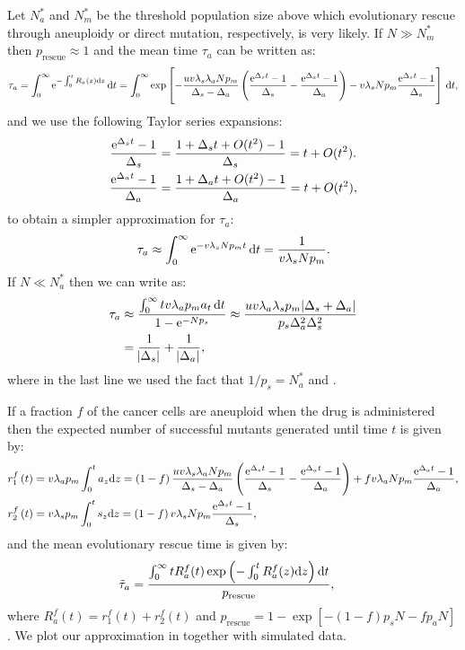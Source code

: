 \documentclass[12pt]{extarticle}
\renewcommand{\d}[1]{\ensuremath{\operatorname{d}\!{#1}}}
\renewcommand{\d}{{\rm d}}
\newcommand{\e}{{\rm e}}
\newcommand{\presc}{p_\text{rescue}}
\begin{document}
\begin{appendices}
Let $N_a^*$ and $N_m^*$ be the threshold population size above which evolutionary rescue through aneuploidy or direct mutation, respectively, is very likely. If $N\gg N_m^*$ then $\presc\approx1$ and the mean time $\tau_a$ can be written as: %
\begin{align*}
\tau_a=\int_0^\infty\e^{-\int_0^t R_a\left(z\right)\d z}\,\d t=\int_0^\infty\exp\left[-\frac{uv\lambda_s\lambda_aNp_m}{\Delta_s-\Delta_a}\left(\frac{\e^{\Delta_s t}-1}{\Delta_s}-\frac{\e^{\Delta_a t}-1}{\Delta_a}\right)-v\lambda_sNp_m\frac{\e^{\Delta_s t}-1}{\Delta_s}\right]\,\d t,
\end{align*} %
and we use the following Taylor series expansions:
\begin{align*}
\frac{\e^{\Delta_s t}-1}{\Delta_s}&=\frac{1+\Delta_s t+O(t^2)-1}{\Delta_s}=t+O(t^2).\\ %
\frac{\e^{\Delta_a t}-1}{\Delta_a}&=\frac{1+\Delta_a t+O(t^2)-1}{\Delta_a}=t+O(t^2), %
\end{align*}
to obtain a simpler approximation for $\tau_a$:
\begin{align}\label{limitapprox3}
\tau_a\approx\int_0^\infty\e^{-v\lambda_sNp_m t}\,\d t=\frac{1}{v\lambda_sNp_m}. %
\end{align}
If $N\ll N_a^*$ then we can write  as:
\begin{align}\nonumber
\tau_a&\approx\frac{\int_0^\infty t v\lambda_ap_ma_t \,\d t}{1-\e^{-Np_s}}\approx\frac{uv\lambda_a\lambda_sp_m\abs{\Delta_s+\Delta_a}}{p_s\Delta_a^2\Delta_s^2}\\ \label{limitapprox4} %
&=\frac{1}{\abs{\Delta_s}}+\frac{1}{\abs{\Delta_a}},
\end{align} %
where in the last line we used the fact that $1/p_s=N_a^*$ and .

If a fraction $f$ of the cancer cells are aneuploid when the drug is administered then the expected number of successful mutants generated until time $t$ is given by: %
\begin{align*}
r_1^f\left(t\right)&=v\lambda_ap_m\int_0^ta_{z} \d z = \left(1-f\right)\frac{uv\lambda_s\lambda_aNp_m}{\Delta_s-\Delta_a}\left(\frac{\e^{\Delta_st}-1}{\Delta_s}-\frac{\e^{\Delta_at}-1}{\Delta_a}\right)+fv\lambda_aNp_m\frac{\e^{\Delta_a t}-1}{\Delta_a},\\ 
r_2^f\left(t\right)&=v\lambda_sp_m\int_0^ts_{z} \d z = \left(1-f\right)v\lambda_sNp_m\frac{\e^{\Delta_s t}-1}{\Delta_s},
\end{align*} 
and the mean evolutionary rescue time is given by:
\begin{align}\label{meantimet2SGV}
\tilde{\tau}_a&= \frac{\int_{0}^{\infty}{tR_a^f(t)\exp\left(-\int_0^{t}{R_a^f(z)\d z}\right) \d t}}{\presc},
\end{align}
where $R_a^f(t)=r_1^f\left(t\right)+r_2^f\left(t\right)$ and $\presc = 1-\exp\left[-\left(1-f\right)p_sN-fp_aN\right]$. We plot our approximation in   together with simulated data.


\end{appendices}
\end{document}

